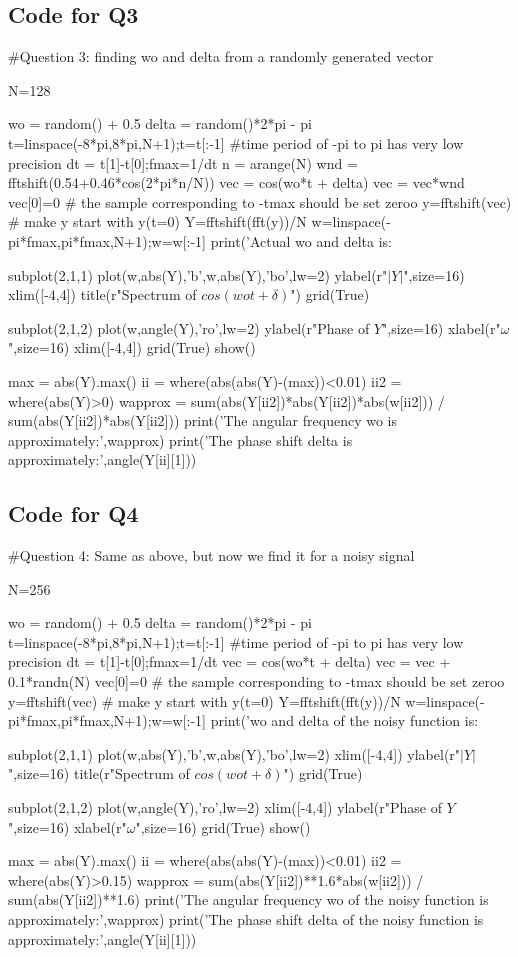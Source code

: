 \documentclass[11pt]{article}
\begin{document}
\subsection{Code for Q3}
\begin{python}
#Question 3: finding wo and delta from a randomly generated vector

N=128

wo = random() + 0.5
delta = random()*2*pi - pi
t=linspace(-8*pi,8*pi,N+1);t=t[:-1] #time period of -pi to pi has very low precision
dt = t[1]-t[0];fmax=1/dt
n = arange(N)
wnd = fftshift(0.54+0.46*cos(2*pi*n/N))
vec = cos(wo*t + delta)
vec = vec*wnd
vec[0]=0 # the sample corresponding to -tmax should be set zeroo
y=fftshift(vec) # make y start with y(t=0)
Y=fftshift(fft(y))/N
w=linspace(-pi*fmax,pi*fmax,N+1);w=w[:-1]
print('Actual wo and delta is: %

subplot(2,1,1)
plot(w,abs(Y),'b',w,abs(Y),'bo',lw=2)
ylabel(r"$|Y|$",size=16)
xlim([-4,4])
title(r"Spectrum of $cos(wot+\delta)$")
grid(True)

subplot(2,1,2)
plot(w,angle(Y),'ro',lw=2)
ylabel(r"Phase of $Y$",size=16)
xlabel(r"$\omega$",size=16)
xlim([-4,4])
grid(True)
show()

max = abs(Y).max()
ii = where(abs(abs(Y)-(max))<0.01)
ii2 = where(abs(Y)>0)
wapprox = sum(abs(Y[ii2])*abs(Y[ii2])*abs(w[ii2])) / sum(abs(Y[ii2])*abs(Y[ii2]))
print('The angular frequency wo is approximately:',wapprox)
print('The phase shift delta is approximately:',angle(Y[ii][1]))
\end{python}

\subsection{Code for Q4}
\begin{python}
#Question 4: Same as above, but now we find it for a noisy signal

N=256

wo = random() + 0.5
delta = random()*2*pi - pi
t=linspace(-8*pi,8*pi,N+1);t=t[:-1] #time period of -pi to pi has very low precision
dt = t[1]-t[0];fmax=1/dt
vec = cos(wo*t + delta)
vec = vec + 0.1*randn(N)
vec[0]=0 # the sample corresponding to -tmax should be set zeroo
y=fftshift(vec) # make y start with y(t=0)
Y=fftshift(fft(y))/N
w=linspace(-pi*fmax,pi*fmax,N+1);w=w[:-1]
print('\nActual wo and delta of the noisy function is: %

subplot(2,1,1)
plot(w,abs(Y),'b',w,abs(Y),'bo',lw=2)
xlim([-4,4])
ylabel(r"$|Y|$",size=16)
title(r"Spectrum of $cos(wot+\delta)$")
grid(True)


subplot(2,1,2)
plot(w,angle(Y),'ro',lw=2)
xlim([-4,4])
ylabel(r"Phase of $Y$",size=16)
xlabel(r"$\omega$",size=16)
grid(True)
show()

max = abs(Y).max()
ii = where(abs(abs(Y)-(max))<0.01)
ii2 = where(abs(Y)>0.15)
wapprox = sum(abs(Y[ii2])**1.6*abs(w[ii2])) / sum(abs(Y[ii2])**1.6)
print('The angular frequency wo of the noisy function is approximately:',wapprox)
print('The phase shift delta of the noisy function is approximately:',angle(Y[ii][1]))
\end{python}
\end{document}
